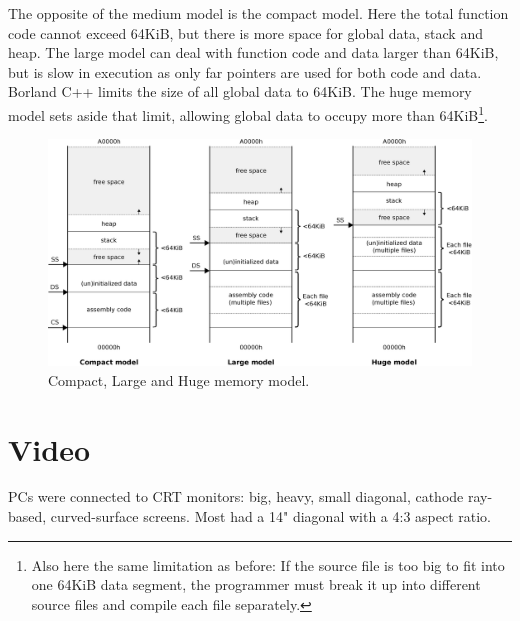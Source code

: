 \documentclass[book.tex]{subfiles}
\begin{document}
The opposite of the medium model is the compact model. Here the total function code cannot exceed 64KiB, but there is more space for global data, stack and heap. The large model can deal with function code and data larger than 64KiB, but is slow in execution as only far pointers are used for both code and data. Borland C++ limits the size of all global data to 64KiB. The huge memory model sets aside that limit, allowing global data to occupy more than 64KiB\footnote{Also here the same limitation as before: If the source file is too big to fit into one 64KiB data segment, the programmer must break it up into different source files and compile each file separately.}.\\

\begin{figure}[H]
\centering
\includegraphics[width=\textwidth]{imgs/drawings/memory/compact_large_huge_mm.eps}
\caption{Compact, Large and Huge memory model.}
\label{fig:mm_huge}
\end{figure}
\par


\pagebreak


\section{Video}

PCs were connected to CRT monitors: big, heavy, small diagonal, cathode ray-based, curved-surface screens. Most had a 14" diagonal with a 4:3 aspect ratio.\\
\par
\end{document}
